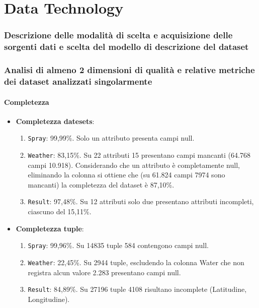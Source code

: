 \part{Data Technology}
\section{Descrizione delle modalità di scelta e acquisizione delle sorgenti dati e scelta del modello di descrizione del dataset}

\section{Analisi di almeno 2 dimensioni di qualità e relative metriche dei dataset analizzati singolarmente}
\subsection{Completezza}

\begin{itemize}
	\item \textbf{Completezza datesets}:
		\begin{enumerate}
			\item \texttt{Spray}: 99,99\%. Solo un attributo presenta campi null.
			\item \texttt{Weather}: 83,15\%. Su 22 attributi 15 presentano campi mancanti (64.768 campi 10.918). Considerando che un attributo è completamente null, eliminando la colonna si ottiene che (su 61.824 campi 7974 sono mancanti) la completezza del dataset è 87,10\%.
			\item \texttt{Result}: 97,48\%. Su 12 attributi solo due presentano attributi incompleti, ciascuno del 15,11\%.
		\end{enumerate}
	
	\item \textbf{Completezza tuple}:
		\begin{enumerate}
			\item \texttt{Spray}: 99,96\%. Su 14835 tuple 584 contengono campi null.
			\item \texttt{Weather}: 22,45\%. Su 2944 tuple, escludendo la colonna Water che non registra alcun valore 2.283 presentano campi null.
			\item \texttt{Result}: 84,89\%. Su 27196 tuple 4108 risultano incomplete (Latitudine, Longitudine).
		\end{enumerate}
	

\end{itemize}

